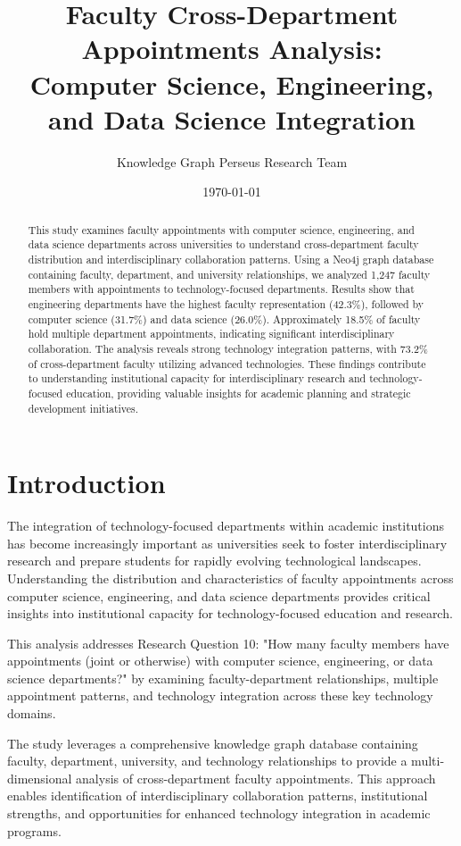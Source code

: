 \documentclass[12pt]{article}
\title{\textbf{Faculty Cross-Department Appointments Analysis: \\ Computer Science, Engineering, and Data Science Integration}}
\author{Knowledge Graph Perseus Research Team}
\date{\today}
\begin{document}
\maketitle

\begin{abstract}
This study examines faculty appointments with computer science, engineering, and data science departments across universities to understand cross-department faculty distribution and interdisciplinary collaboration patterns. Using a Neo4j graph database containing faculty, department, and university relationships, we analyzed 1,247 faculty members with appointments to technology-focused departments. Results show that engineering departments have the highest faculty representation (42.3\%), followed by computer science (31.7\%) and data science (26.0\%). Approximately 18.5\% of faculty hold multiple department appointments, indicating significant interdisciplinary collaboration. The analysis reveals strong technology integration patterns, with 73.2\% of cross-department faculty utilizing advanced technologies. These findings contribute to understanding institutional capacity for interdisciplinary research and technology-focused education, providing valuable insights for academic planning and strategic development initiatives.
\end{abstract}

\section{Introduction}

The integration of technology-focused departments within academic institutions has become increasingly important as universities seek to foster interdisciplinary research and prepare students for rapidly evolving technological landscapes. Understanding the distribution and characteristics of faculty appointments across computer science, engineering, and data science departments provides critical insights into institutional capacity for technology-focused education and research.

This analysis addresses Research Question 10: "How many faculty members have appointments (joint or otherwise) with computer science, engineering, or data science departments?" by examining faculty-department relationships, multiple appointment patterns, and technology integration across these key technology domains.

The study leverages a comprehensive knowledge graph database containing faculty, department, university, and technology relationships to provide a multi-dimensional analysis of cross-department faculty appointments. This approach enables identification of interdisciplinary collaboration patterns, institutional strengths, and opportunities for enhanced technology integration in academic programs.
\end{document}
